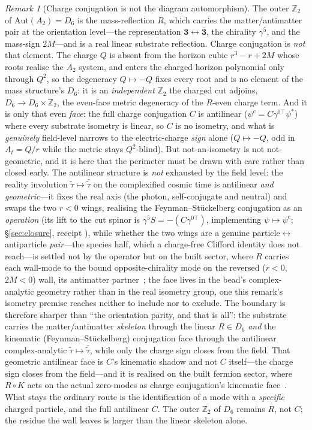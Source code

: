\documentclass[11pt]{article}
\theoremstyle{plain}
\theoremstyle{remark}
\newtheorem{remark}{Remark}
\begin{document}
\begin{remark}[Charge conjugation is not the diagram automorphism]\label{rem:C-not-R}
The outer $\mathbb{Z}_2$ of $\mathrm{Aut}(A_2)=D_6$ is the mass-reflection $R$, which carries the matter/antimatter pair at the orientation level---the representation $\mathbf 3\leftrightarrow\bar{\mathbf 3}$, the chirality $\gamma^5$, and the mass-sign $2M$---and is a real linear substrate reflection. Charge conjugation is \emph{not} that element. The charge $Q$ is absent from the horizon cubic $r^3-r+2M$ whose roots realise the $A_2$ system, and enters the charged horizon polynomial only through $Q^2$, so the degeneracy $Q\mapsto-Q$ fixes every root and is no element of the mass structure's $D_6$: it is an \emph{independent} $\mathbb{Z}_2$ the charged cut adjoins, $D_6\to D_6\times\mathbb{Z}_2$, the even-face metric degeneracy of the $R$-even charge term. And it is only that even \emph{face}: the full charge conjugation $C$ is antilinear ($\psi^c=C\gamma^{0\top}\psi^{*}$) where every substrate isometry is linear, so $C$ is no isometry, and what is \emph{genuinely} field-level narrows to the electric-charge \emph{sign} alone ($Q\mapsto-Q$, odd in $A_t=Q/r$ while the metric stays $Q^2$-blind). But not-an-isometry is not not-geometric, and it is here that the perimeter must be drawn with care rather than closed early. The antilinear structure is \emph{not} exhausted by the field level: the reality involution $\tilde\tau\mapsto\bar{\tilde\tau}$ on the complexified cosmic time is antilinear \emph{and geometric}---it fixes the real axis (the photon, self-conjugate and neutral) and swaps the two $r<0$ wings, realising the Feynman--St\"uckelberg conjugation as an \emph{operation} (its lift to the cut spinor is $\gamma^{5}S=-(C\gamma^{0\top})$, implementing $\psi\mapsto\psi^{c}$; \S\ref{sec:closure}, receipt ), while whether the two wings are a genuine particle$\leftrightarrow$antiparticle \emph{pair}---the species half, which a charge-free Clifford identity does not reach---is settled not by the operator but on the built sector, where $R$ carries each wall-mode to the bound opposite-chirality mode on the reversed ($r<0$, $2M<0$) wall, its antimatter partner~\cite{JanzenMatter}; the face lives in the bead's complex-analytic geometry rather than in the real isometry group, one this remark's isometry premise reaches neither to include nor to exclude. The boundary is therefore sharper than ``the orientation parity, and that is all'': the substrate carries the matter/antimatter \emph{skeleton} through the linear $R\in D_6$ \emph{and} the kinematic (Feynman--St\"uckelberg) conjugation face through the antilinear complex-analytic $\tilde\tau\mapsto\bar{\tilde\tau}$, while only the charge sign closes from the field. That geometric antilinear face is $C$'s kinematic shadow and not $C$ itself---the charge sign closes from the field---and it is realised on the built fermion sector, where $R\circ K$ acts on the actual zero-modes as charge conjugation's kinematic face~\cite{JanzenMatter}. What stays the ordinary route is the identification of a mode with a \emph{specific} charged particle, and the full antilinear $C$. The outer $\mathbb{Z}_2$ of $D_6$ remains $R$, not $C$; the residue the wall leaves is larger than the linear skeleton alone.

\end{remark}
\end{document}
